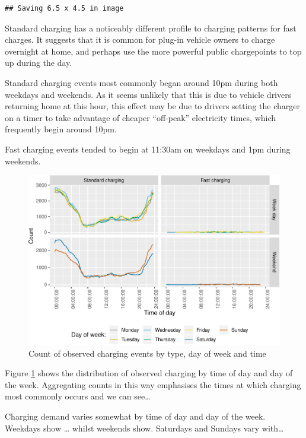 \documentclass[]{article}
\begin{document}
\begin{verbatim}
## Saving 6.5 x 4.5 in image
\end{verbatim}

Standard charging has a noticeably different profile to charging
patterns for fast charges. It suggests that it is common for plug-in
vehicle owners to charge overnight at home, and perhaps use the more
powerful public chargepoints to top up during the day.

Standard charging events most commonly began around 10pm during both
weekdays and weekends. As it seems unlikely that this is due to vehicle
drivers returning home at this hour, this effect may be due to drivers
setting the charger on a timer to take advantage of cheaper ``off-peak''
electricity times, which frequently begin around 10pm.

Fast charging events tended to begin at 11:30am on weekdays and 1pm
during weekends.

\begin{figure}
\centering
\includegraphics{EVBB_report_files/figure-latex/chargeTime-1.pdf}
\caption{\label{fig:chargeTime}Count of observed charging events by type,
day of week and time}
\end{figure}

Figure \ref{fig:chargeTime} shows the distribution of observed charging
by time of day and day of the week. Aggregating counts in this way
emphasises the times at which charging most commonly occurs and we can
see\ldots{}

Charging demand varies somewhat by time of day and day of the week.
Weekdays show \ldots{} whilst weekends show. Saturdays and Sundays vary
with\ldots{}
\end{document}
